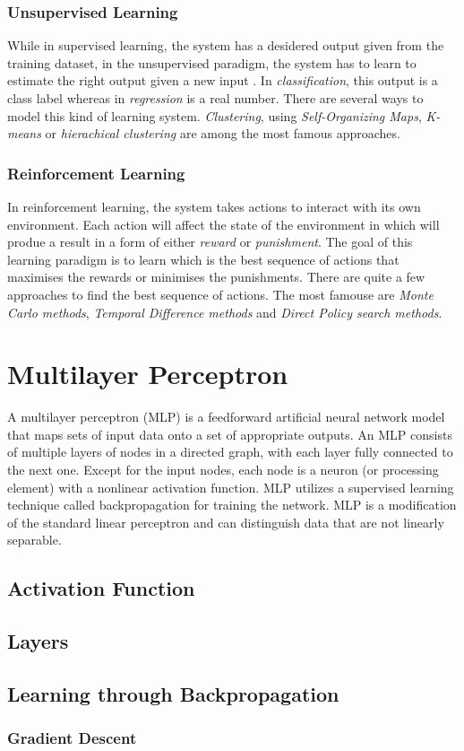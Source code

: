 \subsubsection{Unsupervised Learning}
While in supervised learning, the system has a desidered output given from the training dataset, in the unsupervised paradigm, the system has to learn to estimate the right output given a new input \cite{ghahramani2004unsupervised}. In \textit{classification}, this output is a class label whereas in \textit{regression} is a real number. There are several ways to model this kind of learning system. \textit{Clustering}, using \textit{Self-Organizing Maps}, \textit{K-means} or \textit{hierachical clustering} are among the most famous approaches.

\subsubsection{Reinforcement Learning}
In reinforcement learning, the system takes actions to interact with its own environment. Each action will affect the state of the environment in which will produe a result in a form of either \textit{reward} or \textit{punishment}. The goal of this learning paradigm is to learn which is the best sequence of actions that maximises the rewards or minimises the punishments. There are quite a few approaches to find the best sequence of actions. The most famouse are \textit{Monte Carlo methods}, \textit{Temporal Difference methods} and \textit{Direct Policy search methods}.

\section{Multilayer Perceptron}
A multilayer perceptron (MLP) is a feedforward artificial neural network model that maps sets of input data onto a set of appropriate outputs. An MLP consists of multiple layers of nodes in a directed graph, with each layer fully connected to the next one. Except for the input nodes, each node is a neuron (or processing element) with a nonlinear activation function. MLP utilizes a supervised learning technique called backpropagation for training the network. MLP is a modification of the standard linear perceptron and can distinguish data that are not linearly separable.

\subsection{Activation Function}


\subsection{Layers}


\subsection{Learning through Backpropagation}


\subsubsection{Gradient Descent}
